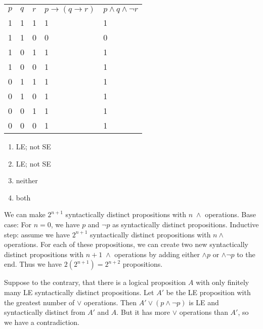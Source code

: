 \documentclass[solution, letterpaper]{cs20}
\begin{document}
\begin{solution}

\subsolution 

\begin{table}[h]
\centering
\label{my-label}
\begin{tabular}{lllll}
$p$ & $q$ & $r$& $p \to (q \to r)$ & $p \land q \land \neg r$ \\
1 & 1 & 1 & 1               & 1                      \\
1 & 1 & 0 & 0               & 0                      \\
1 & 0 & 1 & 1               & 1                      \\
1 & 0 & 0 & 1               & 1                      \\
0 & 1 & 1 & 1               & 1                      \\
0 & 1 & 0 & 1               & 1                      \\
0 & 0 & 1 & 1               & 1                      \\
0 & 0 & 0 & 1               & 1                     
\end{tabular}
\end{table}

\subsolution

\begin{enumerate}
\item LE; not SE
\item LE; not SE
\item neither
\item both
\end{enumerate}

\subsolution We can make $2^{n+1}$ syntactically distinct propositions with $n \; \land$ operations. Base case: For $n = 0$, we have $p$ and $\neg p$ as syntactically distinct propositions. Inductive step: assume we have $2^{n+1}$ syntactically distinct propositions with $n \land$ operations. For each of these propositions, we can create two new syntactically distinct propositions with $n+1 \; \land$ operations by adding either $\land p$ or $\land \neg p$ to the end. Thus we have $2(2^{n+1}) = 2^{n+2}$ propositions.

\subsolution Suppose to the contrary, that there is a logical proposition $A$ with only finitely many LE syntactically distinct propositions. Let $A'$ be the LE proposition with the greatest number of $\lor$ operations. Then $A' \lor (p \land \neg p)$ is LE and syntactically distinct from $A'$ and $A$. But it has more $\lor$ operations than $A'$, so we have a contradiction.

\end{solution}
\end{document}
